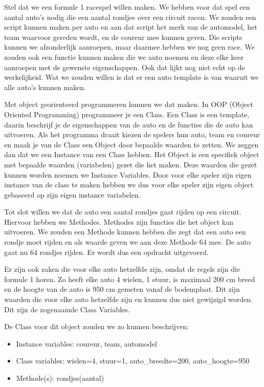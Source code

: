 Stel dat we een formule 1 racespel willen maken. We hebben voor dat spel een aantal auto's nodig die een aantal rondjes over een circuit racen. We zouden een script kunnen maken per auto en aan dat script het merk van de automodel, het team waarvoor gereden wordt, en de coureur mee kunnen geven. Die scripts kunnen we afzonderlijk aanroepen, maar daarmee hebben we nog geen race. We zouden ook een functie kunnen maken die we auto noemen en deze elke keer aanroepen met de gewenste eigenschappen. Ook dat lijkt nog niet echt op de werkelijheid. Wat we zouden willen is dat er een auto template is van waaruit we alle auto's kunnen maken.

Met object georienteerd programmeren kunnen we dat maken. In OOP (Object Oriented Programming) programmeer je een Class. Een Class is een template, daarin beschrijf je de eigenschappen van de auto en de functies die de auto kan uitvoeren. Als het programma draait kiezen de spelers hun auto, team en coureur en maak je van de Class een Object door bepaalde waarden te zetten. We zeggen dan dat we een Instance van een Class hebben. Het Object is een specifiek object met bepaalde waarden (variabelen) gezet die het  maken. Deze waarden die gezet kunnen worden noemen we Instance Variables. Door voor elke speler zijn eigen instance van de class te maken hebben we dus voor elke speler zijn eigen object gebaseerd op zijn eigen instance variabelen.

Tot slot willen we dat de auto een aantal rondjes gaat rijden op een circuit. Hiervoor hebben we Methodes. Methodes zijn functies die het object kan uitvoeren. We zouden een Methode kunnen hebben die zegt dat een auto een rondje moet rijden en als waarde geven we aan deze Methode 64 mee. De auto gaat nu 64 rondjes rijden. Er wordt dus een opdracht uitgevoerd.

Er zijn ook zaken die voor elke auto hetzelfde zijn, omdat de regels zijn die formule 1 horen. Zo heeft elke auto 4 wielen, 1 stuur, is maximaal 200 cm breed en de hoogte van de auto is 950 cm gemeten vanaf de bodemplaat. Dit zijn waarden die voor elke auto hetzelfde zijn en kunnen dus niet gewijzigd worden. Dit zijn de zogenaamde Class Variables.

De Class voor dit object zouden we zo kunnen beschrijven:
\begin{itemize}
\item Instance variables: coureur, team, automodel
\item Class variables: wielen=4, stuur=1, auto\_breedte=200, auto\_hoogte=950
\item Methode(s): rondjes(aantal)
\end{itemize}

